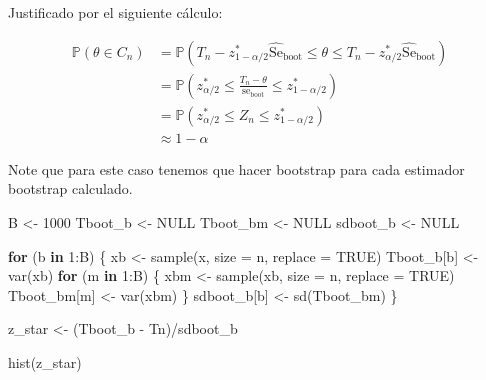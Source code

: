 \documentclass[
  12pt,
]{book}
\newenvironment{Shaded}{\begin{snugshade}}{\end{snugshade}}
\newcommand{\AttributeTok}[1]{\textcolor[rgb]{0.77,0.63,0.00}{#1}}
\newcommand{\ConstantTok}[1]{\textcolor[rgb]{0.00,0.00,0.00}{#1}}
\newcommand{\ControlFlowTok}[1]{\textcolor[rgb]{0.13,0.29,0.53}{\textbf{#1}}}
\newcommand{\DecValTok}[1]{\textcolor[rgb]{0.00,0.00,0.81}{#1}}
\newcommand{\FunctionTok}[1]{\textcolor[rgb]{0.00,0.00,0.00}{#1}}
\newcommand{\NormalTok}[1]{#1}
\newcommand{\OtherTok}[1]{\textcolor[rgb]{0.56,0.35,0.01}{#1}}
\newcommand{\SpecialCharTok}[1]{\textcolor[rgb]{0.00,0.00,0.00}{#1}}
\theoremstyle{definition}
\theoremstyle{definition}
\theoremstyle{definition}
\theoremstyle{definition}
\theoremstyle{remark}
\begin{document}
Justificado por el siguiente cálculo:

\begin{align*}
\mathbb{P}\left(\theta \in C_{n}\right) &=\mathbb{P}\left(T_{n}-z_{1-\alpha / 2}^{*} \widehat{\mathrm{Se}}_{\mathrm{boot}} \leq \theta \leq T_{n}-z_{\alpha / 2}^{*} \widehat{\mathrm{Se}}_{\mathrm{boot}}\right) \\
&=\mathbb{P}\left(z_{\alpha / 2}^{*} \leq \frac{T_{n}-\theta}{\mathrm{se}_{\mathrm{boot}}} \leq z_{1-\alpha / 2}^{*}\right) \\
&=\mathbb{P}\left(z_{\alpha / 2}^{*} \leq Z_{n} \leq z_{1-\alpha / 2}^{*}\right) \\
& \approx 1-\alpha
\end{align*}

Note que para este caso tenemos que hacer bootstrap para cada estimador bootstrap calculado.

\begin{Shaded}
\begin{Highlighting}[]
\NormalTok{B }\OtherTok{\textless{}{-}} \DecValTok{1000}
\NormalTok{Tboot\_b }\OtherTok{\textless{}{-}} \ConstantTok{NULL}
\NormalTok{Tboot\_bm }\OtherTok{\textless{}{-}} \ConstantTok{NULL}
\NormalTok{sdboot\_b }\OtherTok{\textless{}{-}} \ConstantTok{NULL}

\ControlFlowTok{for}\NormalTok{ (b }\ControlFlowTok{in} \DecValTok{1}\SpecialCharTok{:}\NormalTok{B) \{}
\NormalTok{    xb }\OtherTok{\textless{}{-}} \FunctionTok{sample}\NormalTok{(x, }\AttributeTok{size =}\NormalTok{ n, }\AttributeTok{replace =} \ConstantTok{TRUE}\NormalTok{)}
\NormalTok{    Tboot\_b[b] }\OtherTok{\textless{}{-}} \FunctionTok{var}\NormalTok{(xb)}
    \ControlFlowTok{for}\NormalTok{ (m }\ControlFlowTok{in} \DecValTok{1}\SpecialCharTok{:}\NormalTok{B) \{}
\NormalTok{        xbm }\OtherTok{\textless{}{-}} \FunctionTok{sample}\NormalTok{(xb, }\AttributeTok{size =}\NormalTok{ n, }\AttributeTok{replace =} \ConstantTok{TRUE}\NormalTok{)}
\NormalTok{        Tboot\_bm[m] }\OtherTok{\textless{}{-}} \FunctionTok{var}\NormalTok{(xbm)}
\NormalTok{    \}}
\NormalTok{    sdboot\_b[b] }\OtherTok{\textless{}{-}} \FunctionTok{sd}\NormalTok{(Tboot\_bm)}
\NormalTok{\}}

\NormalTok{z\_star }\OtherTok{\textless{}{-}}\NormalTok{ (Tboot\_b }\SpecialCharTok{{-}}\NormalTok{ Tn)}\SpecialCharTok{/}\NormalTok{sdboot\_b}

\FunctionTok{hist}\NormalTok{(z\_star)}
\end{Highlighting}
\end{Shaded}
\end{document}
